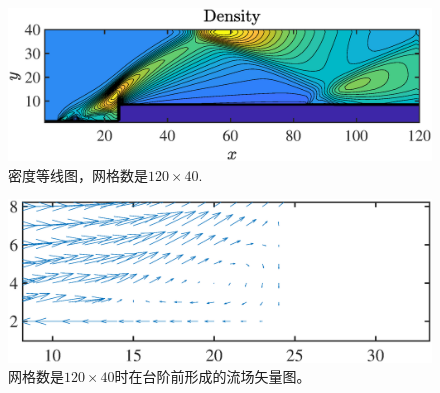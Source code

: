 \documentclass[12pt]{article}
\begin{document}
\begin{figure}[htp]
	\centering
	\includegraphics[width=14cm]{density40.eps}
	\caption{密度等线图，网格数是$120\times 40$.}
	\label{fig:density40}
\end{figure}

\begin{figure}[htp]
	\centering
	\includegraphics[width=14cm]{eddy.eps}
	\caption{网格数是$120\times 40$时在台阶前形成的流场矢量图。}
	\label{fig:eddy}
\end{figure}





\end{document}
